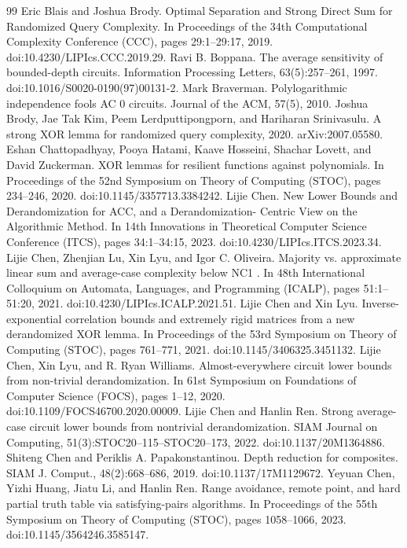 \begin{thebibliography}{99}
 Eric Blais and Joshua Brody. Optimal Separation and Strong Direct Sum for Randomized Query Complexity. In Proceedings of the 34th Computational Complexity Conference (CCC), pages 29:1–29:17, 2019. doi:10.4230/LIPIcs.CCC.2019.29.
 Ravi B. Boppana. The average sensitivity of bounded-depth circuits. Information Processing Letters, 63(5):257–261, 1997. doi:10.1016/S0020-0190(97)00131-2.
 Mark Braverman. Polylogarithmic independence fools AC 0 circuits. Journal of the ACM, 57(5), 2010.
 Joshua Brody, Jae Tak Kim, Peem Lerdputtipongporn, and Hariharan Srinivasulu. A strong XOR lemma for randomized query complexity, 2020. arXiv:2007.05580.
 Eshan Chattopadhyay, Pooya Hatami, Kaave Hosseini, Shachar Lovett, and David Zuckerman. XOR lemmas for resilient functions against polynomials. In Proceedings of the 52nd Symposium on Theory of Computing (STOC), pages 234–246, 2020. doi:10.1145/3357713.3384242.
 Lijie Chen. New Lower Bounds and Derandomization for ACC, and a Derandomization- Centric View on the Algorithmic Method. In 14th Innovations in Theoretical Computer Science Conference (ITCS), pages 34:1–34:15, 2023. doi:10.4230/LIPIcs.ITCS.2023.34.
 Lijie Chen, Zhenjian Lu, Xin Lyu, and Igor C. Oliveira. Majority vs. approximate linear sum and average-case complexity below NC1 . In 48th International Colloquium on Automata, Languages, and Programming (ICALP), pages 51:1–51:20, 2021. doi:10.4230/LIPIcs.ICALP.2021.51.       
 Lijie Chen and Xin Lyu. Inverse-exponential correlation bounds and extremely rigid matrices from a new derandomized XOR lemma. In Proceedings of the 53rd Symposium on Theory of Computing (STOC), pages 761–771, 2021. doi:10.1145/3406325.3451132.
 Lijie Chen, Xin Lyu, and R. Ryan Williams. Almost-everywhere circuit lower bounds from non-trivial derandomization. In 61st Symposium on Foundations of Computer Science (FOCS), pages 1–12, 2020. doi:10.1109/FOCS46700.2020.00009.
 Lijie Chen and Hanlin Ren. Strong average-case circuit lower bounds from nontrivial derandomization. SIAM Journal on Computing, 51(3):STOC20–115–STOC20–173, 2022. doi:10.1137/20M1364886.
 Shiteng Chen and Periklis A. Papakonstantinou. Depth reduction for composites. SIAM J. Comput., 48(2):668–686, 2019. doi:10.1137/17M1129672.
 Yeyuan Chen, Yizhi Huang, Jiatu Li, and Hanlin Ren. Range avoidance, remote point, and hard partial truth table via satisfying-pairs algorithms. In Proceedings of the 55th Symposium on Theory of Computing (STOC), pages 1058–1066, 2023. doi:10.1145/3564246.3585147.

\end{thebibliography}
